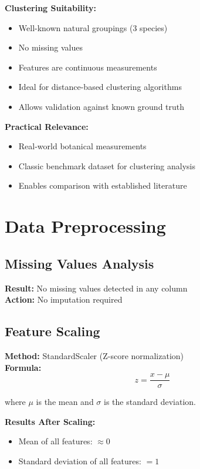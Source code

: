 \documentclass[12pt,a4paper]{article}
\begin{document}
\textbf{Clustering Suitability:}
\begin{itemize}
    \item[$\checkmark$] Well-known natural groupings (3 species)
    \item[$\checkmark$] No missing values
    \item[$\checkmark$] Features are continuous measurements
    \item[$\checkmark$] Ideal for distance-based clustering algorithms
    \item[$\checkmark$] Allows validation against known ground truth
\end{itemize}

\textbf{Practical Relevance:}
\begin{itemize}
    \item[$\checkmark$] Real-world botanical measurements
    \item[$\checkmark$] Classic benchmark dataset for clustering analysis
    \item[$\checkmark$] Enables comparison with established literature
\end{itemize}

\newpage

\section{Data Preprocessing}

\subsection{Missing Values Analysis}

\textbf{Result:} No missing values detected in any column\\
\textbf{Action:} No imputation required

\subsection{Feature Scaling}

\textbf{Method:} StandardScaler (Z-score normalization)\\
\textbf{Formula:} 
\begin{equation}
z = \frac{x - \mu}{\sigma}
\end{equation}

where $\mu$ is the mean and $\sigma$ is the standard deviation.

\textbf{Results After Scaling:}
\begin{itemize}
    \item Mean of all features: $\approx 0$
    \item Standard deviation of all features: $= 1$
\end{itemize}
\end{document}
